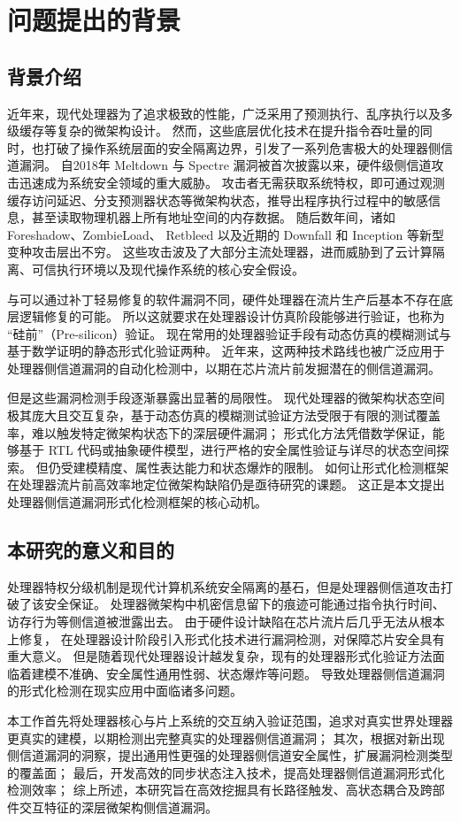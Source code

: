 \section{问题提出的背景}


\subsection{背景介绍}

近年来，现代处理器为了追求极致的性能，广泛采用了预测执行、乱序执行以及多级缓存等复杂的微架构设计。
然而，这些底层优化技术在提升指令吞吐量的同时，也打破了操作系统层面的安全隔离边界，引发了一系列危害极大的处理器侧信道漏洞。
自2018年 Meltdown\cite{10.1145/3357033} 与 Spectre\cite{8835233} 漏洞被首次披露以来，硬件级侧信道攻击迅速成为系统安全领域的重大威胁。
攻击者无需获取系统特权，即可通过观测缓存访问延迟、分支预测器状态等微架构状态，推导出程序执行过程中的敏感信息，甚至读取物理机器上所有地址空间的内存数据。
随后数年间，诸如Foreshadow\cite{10.5555/3277203.3277277}、ZombieLoad\cite{10.1145/3319535.3354252}、
Retbleed\cite{281436} 以及近期的 Downfall\cite{10.5555/3620237.3620639} 和 Inception\cite{10.5555/3620237.3620646} 等新型变种攻击层出不穷。
这些攻击波及了大部分主流处理器，进而威胁到了云计算隔离、可信执行环境以及现代操作系统的核心安全假设。

与可以通过补丁轻易修复的软件漏洞不同，硬件处理器在流片生产后基本不存在底层逻辑修复的可能。
所以这就要求在处理器设计仿真阶段能够进行验证，也称为 “硅前”（Pre-silicon）验证。
现在常用的处理器验证手段有动态仿真的模糊测试与基于数学证明的静态形式化验证两种。
近年来，这两种技术路线也被广泛应用于处理器侧信道漏洞的自动化检测中，以期在芯片流片前发掘潜在的侧信道漏洞。


但是这些漏洞检测手段逐渐暴露出显著的局限性。
现代处理器的微架构状态空间极其庞大且交互复杂，基于动态仿真的模糊测试验证方法受限于有限的测试覆盖率，难以触发特定微架构状态下的深层硬件漏洞；
形式化方法凭借数学保证，能够基于 RTL 代码或抽象硬件模型，进行严格的安全属性验证与详尽的状态空间探索。
但仍受建模精度、属性表达能力和状态爆炸的限制。
如何让形式化检测框架在处理器流片前高效率地定位微架构缺陷仍是亟待研究的课题。
这正是本文提出处理器侧信道漏洞形式化检测框架的核心动机。


\subsection{本研究的意义和目的}

处理器特权分级机制是现代计算机系统安全隔离的基石，但是处理器侧信道攻击打破了该安全保证。
处理器微架构中机密信息留下的痕迹可能通过指令执行时间、访存行为等侧信道被泄露出去。
由于硬件设计缺陷在芯片流片后几乎无法从根本上修复，
在处理器设计阶段引入形式化技术进行漏洞检测，对保障芯片安全具有重大意义。
但是随着现代处理器设计越发复杂，现有的处理器形式化验证方法面临着建模不准确、安全属性通用性弱、状态爆炸等问题。
导致处理器侧信道漏洞的形式化检测在现实应用中面临诸多问题。


本工作首先将处理器核心与片上系统的交互纳入验证范围，追求对真实世界处理器更真实的建模，以期检测出完整真实的处理器侧信道漏洞；
其次，根据对新出现侧信道漏洞的洞察，提出通用性更强的处理器侧信道安全属性，扩展漏洞检测类型的覆盖面；
最后，开发高效的同步状态注入技术，提高处理器侧信道漏洞形式化检测效率；
综上所述，本研究旨在高效挖掘具有长路径触发、高状态耦合及跨部件交互特征的深层微架构侧信道漏洞。